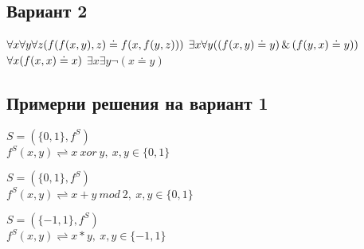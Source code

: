 \documentclass{article}
\begin{document}
    \subsection{Вариант 2}

$\forall x\forall y\forall z (f(f(x,y),z) \doteq  f(x,f(y,z)))\\$
$\exists x \forall y ((f(x,y) \doteq y)\, \& \,(f(y,x) \doteq y))\\$
$\forall x(f(x,x) \doteq x) \\$
$\exists x \exists y \lnot( x \doteq y)$

\subsection{Примерни решения на вариант 1}
\begin{addmargin}[1em]{2em}
    \begin{center}
        $ S = ( \{0, 1\}, f^S)$ \\
        $f^S(x,y)\rightleftharpoons x\ xor\ y ,\ x,y \in \{0, 1\}$
    \end{center}
\end{addmargin}
\vskip 0.2in
\begin{addmargin}[1em]{2em}
    \begin{center}
        $ S = ( \{0, 1\}, f^S)$ \\
        $f^S(x,y)\rightleftharpoons x+y\ mod\ 2 ,\ x,y \in \{0, 1\}$
    \end{center}
\end{addmargin}
\vskip 0.2in
\begin{addmargin}[1em]{2em}
    \begin{center}
        $ S = ( \{-1, 1\}, f^S)$ \\
        $f^S(x,y)\rightleftharpoons x*y ,\ x,y \in \{-1, 1\}$
    \end{center}
\end{addmargin}
\end{document}
